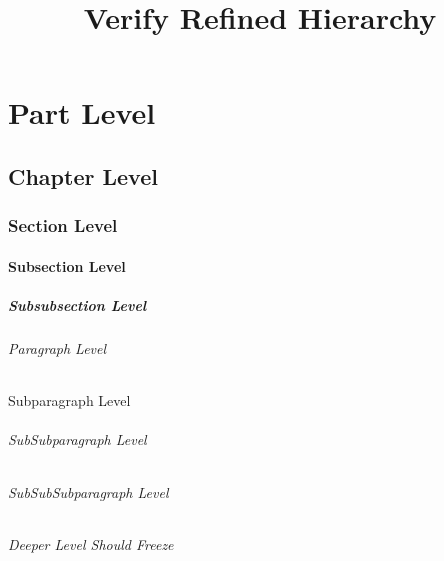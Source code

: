 \documentclass[type=report,theme=light,language=de]{semio}
\title{Verify Refined Hierarchy}
\begin{document}
\maketitle
\tableofcontents
\part{Part Level}
\chapter{Chapter Level}
\section{Section Level}
\subsection{Subsection Level}
\subsubsection{Subsubsection Level}
\paragraph{Paragraph Level}
\subparagraph{Subparagraph Level}
\begin{SemioNest}
\paragraph{SubSubparagraph Level}
\begin{SemioNest}
\paragraph{SubSubSubparagraph Level}
\begin{SemioNest}
\paragraph{Deeper Level Should Freeze}
\end{SemioNest}
\end{SemioNest}
\end{SemioNest}
\end{document}
